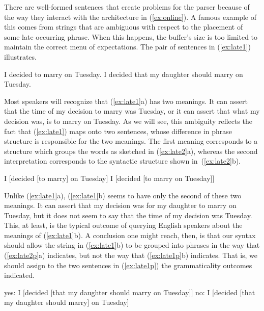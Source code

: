 {There are well-formed sentences that create problems for the parser because of the way they interact with the architecture in (\ref{ex:online}). A famous example of this comes from strings that are ambiguous with respect to the placement of some late occurring phrase. When this happens, the buffer's size is too limited to maintain the correct menu of expectations.  The pair of sentences in (\ref{ex:late1}) illustrates.
\begin{exe}
\ex \label{ex:late1} 
\begin{xlist}
	\ex I decided to marry on Tuesday.
	\ex I decided that my daughter should marry on Tuesday.
\end{xlist}
\end{exe}
Most speakers will recognize that (\ref{ex:late1}a) has two meanings. It can assert that the time of my decision to marry was Tuesday, or it can assert that what my decision was, is to marry on Tuesday. As we will see, this ambiguity reflects the fact that (\ref{ex:late1}) maps onto two sentences, whose difference in phrase structure is responsible for the two meanings. The first meaning corresponds to a structure which groups the words as sketched in (\ref{ex:late2}a), whereas the second interpretation corresponds to the syntactic structure shown in~(\ref{ex:late2}b).
\begin{exe}
\ex \label{ex:late2} 
\begin{xlist}
	\ex I [decided [to marry] on Tuesday]
	\ex I [decided [to marry on Tuesday]]
\end{xlist}
\end{exe}
Unlike (\ref{ex:late1}a), (\ref{ex:late1}b) seems to have only the second of these two meanings. It can assert that my decision was for my daughter to marry on Tuesday, but it does not seem to say that the time of my decision was Tuesday. This, at least, is the typical outcome of querying English speakers about the meanings of (\ref{ex:late1}b). A conclusion one might reach, then, is that our syntax should allow the string in (\ref{ex:late1}b) to be grouped into phrases in the way that (\ref{ex:late2p}a) indicates, but not the way that (\ref{ex:late1p}b) indicates. That is, we should assign to the two sentences in (\ref{ex:late1p}) the grammaticality outcomes indicated. 
\begin{exe}
\raggedright
	\ex \label{ex:late1p}
	\begin{xlist}
		\ex yes: I [decided [that my daughter should marry on Tuesday]]
		\ex no: I [decided [that my daughter should marry] on Tuesday]
	\end{xlist}
\end{exe}

}
